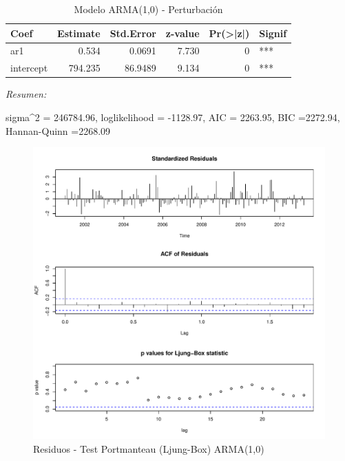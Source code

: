 \documentclass[12pt,oneside]{book}\usepackage[]{graphicx}\usepackage[]{color}
\makeatletter
\def\maxwidth{ %
  \ifdim\Gin@nat@width>\linewidth
    \linewidth
  \else
    \Gin@nat@width
  \fi
}
\newenvironment{knitrout}{}{} %
\theoremstyle{definition} %
\makeatother
\begin{document}
\begin{knitrout}
\color{fgcolor}\begin{table}

\caption{\label{tab:unnamed-chunk-45}\label{tab:arma_nt}Modelo ARMA(1,0) - Perturbación}
\centering
\begin{threeparttable}
\begin{tabular}[t]{lrrrrl}
\toprule
Coef & Estimate & Std.Error & z-value & Pr(>|z|) & Signif\\
\midrule
\rowcolor{gray!6}  ar1 & 0.534 & 0.0691 & 7.730 & 0 & ***\\
intercept & 794.235 & 86.9489 & 9.134 & 0 & ***\\
\bottomrule
\end{tabular}
\begin{tablenotes}
\item \textit{Resumen:} 
\item sigma\textasciicircum{}2 = 246784.96, loglikelihood = -1128.97, AIC = 2263.95, BIC =2272.94, Hannan-Quinn =2268.09
\end{tablenotes}
\end{threeparttable}
\end{table}


\end{knitrout}


\begin{knitrout}
\color{fgcolor}\begin{figure}[H]

{\centering \includegraphics[width=\maxwidth]{figure/unnamed-chunk-46-1} 

}

\caption{\label{fig:nt_resid} Residuos - Test Portmanteau (Ljung-Box) ARMA(1,0)}\label{fig:unnamed-chunk-46}
\end{figure}


\end{knitrout}
\end{document}
